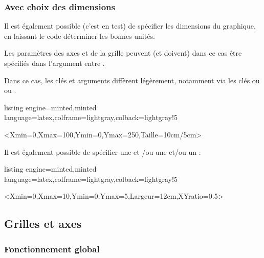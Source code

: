 \documentclass[11pt,a4paper]{ltxdoc}
\begin{document}
\pagebreak

\subsubsection{Avec choix des dimensions}

Il est également possible (c'est en test) de spécifier les dimensions du graphique, en laissant le code déterminer les bonnes unités.

\smallskip

Les paramètres des axes et de la grille peuvent (et doivent) dans ce cas être spécifiés dans l'argument entre .

\smallskip

Dans ce cas, les clés et arguments diffèrent légèrement, notamment via les clés  ou  ou .

\begin{tcblisting}{listing engine=minted,minted language=latex,colframe=lightgray,colback=lightgray!5}
\begin{GraphiqueTikz}%
    [Xgrille=10,Xgrilles=5,Ygrille=50,Ygrilles=25]
    <Xmin=0,Xmax=100,Ymin=0,Ymax=250,Taille={10cm/5cm}>
\end{GraphiqueTikz}
\end{tcblisting}

Il est également possible de spécifier une  et /ou une  et/ou un  :

\begin{tcblisting}{listing engine=minted,minted language=latex,colframe=lightgray,colback=lightgray!5}
\begin{GraphiqueTikz}%
    <Xmin=0,Xmax=10,Ymin=0,Ymax=5,Largeur=12cm,XYratio=0.5>
\end{GraphiqueTikz}
\end{tcblisting}

\pagebreak

\subsection{Grilles et axes}\label{creaaxesgr}

\subsubsection{Fonctionnement global}
\end{document}
